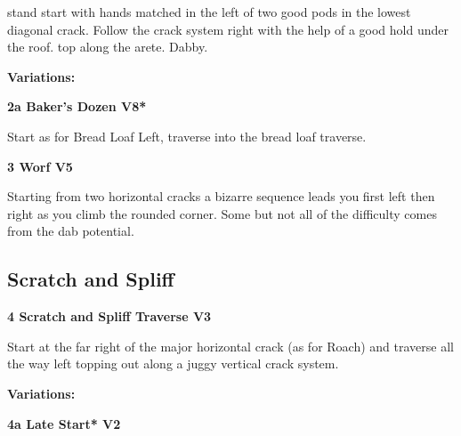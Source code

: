 \begin{multicols}{2}
			\begin{adjustwidth}{0.5cm}{}				
			stand start with hands matched in the left of two good pods in the lowest diagonal crack. Follow the crack system right with the help of a good hold under the roof. top along the arete. Dabby.
			\end{adjustwidth}
				\begin{adjustwidth}{0.5cm}{}				
				\textbf{Variations:} \newline
					\label{vr:Baker's Dozen}
\colorbox{Goldenrod!50}{
\parbox{0.95\linewidth}{
\textbf{
2a Baker's Dozen V8*  
}
}
}

					\begin{adjustwidth}{0.5cm}{}				
					Start as for Bread Loaf Left, traverse into the bread loaf traverse.
					\end{adjustwidth}
				\end{adjustwidth}

			\label{rt:Worf}
\colorbox{RoyalBlue!20}{
\parbox{0.95\linewidth}{
\textbf{
3 Worf V5  
}
}
}

			\begin{adjustwidth}{0.5cm}{}				
			Starting from two horizontal cracks a bizarre sequence leads you first left then right as you climb the rounded corner. Some but not all of the difficulty comes from the dab potential.
			\end{adjustwidth}

		\subsection*{Scratch and Spliff}\label{bf:Scratch and Spliff}
			
			\label{rt:Scratch and Spliff Traverse}
\colorbox{green!20}{
\parbox{0.95\linewidth}{
\textbf{
4 Scratch and Spliff Traverse V3  
}
}
}

			\begin{adjustwidth}{0.5cm}{}				
			Start at the far right of the major horizontal crack (as for Roach) and traverse all the way left topping out along a juggy vertical crack system.
			\end{adjustwidth}
				\begin{adjustwidth}{0.5cm}{}				
				\textbf{Variations:} \newline
					\label{vr:Late Start}
\colorbox{green!20}{
\parbox{0.95\linewidth}{
\textbf{
4a Late Start* V2  
}
}
}


\end{adjustwidth}
\end{multicols}
